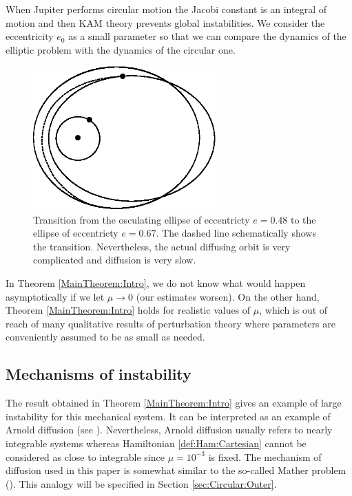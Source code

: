 When Jupiter performs circular motion the Jacobi constant is an
integral of motion and then KAM theory prevents global instabilities.
We consider the eccentricity $e_0$ as a small parameter so that we can
compare the dynamics of the elliptic problem with the dynamics of the
circular one.

\begin{figure}[h]
  \begin{center}
    \includegraphics[width=7cm]{Ellipse.eps}
  \end{center}
  \caption{Transition from the osculating ellipse of eccentricty
    $e=0.48$ to the ellipse of eccentricty $e=0.67$. The dashed line
    schematically shows the transition. Nevertheless, the actual
    diffusing orbit is very complicated and diffusion is very slow.}
  \label{fig:EllipseChange}
\end{figure}

In Theorem \ref{MainTheorem:Intro}, we do not know what would happen
asymptotically if we let $\mu\rightarrow 0$ (our estimates worsen).
On the other hand, Theorem \ref{MainTheorem:Intro} holds for realistic
values of $\mu$, which is out of reach of many qualitative results of
perturbation theory where parameters are conveniently assumed to be as
small as needed.

\subsection{Mechanisms of instability}

The result obtained in Theorem \ref{MainTheorem:Intro} gives an
example of large instability for this mechanical system. It can be
interpreted as an example of Arnold diffusion (see \cite{Arnold64}).
Nevertheless, Arnold diffusion usually refers to nearly integrable
systems whereas Hamiltonian \eqref{def:Ham:Cartesian} cannot be
considered as close to integrable since $\mu=10^{-3}$ is fixed. The
mechanism of diffusion used in this paper is somewhat similar to the
so-called Mather problem
(\cite{Mather96,BolotinT99,DelshamsLS00,Kaloshin03}).  This analogy
will be specified in Section \ref{sec:Circular:Outer}.

